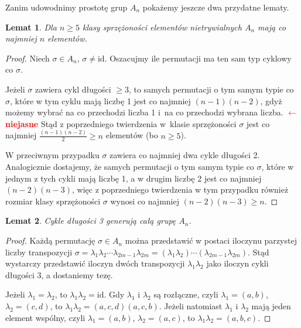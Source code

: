 \documentclass[licencjacka]{pracamgr}
\newtheorem{lemma}{Lemat}[section]
\begin{document}
Zanim udowodnimy prostotę grup $A_n$ pokażemy jeszcze dwa przydatne
lematy.

\begin{lemma}\label{lemma_big_con}
    Dla $n \ge 5$ klasy sprzężoności elementów nietrywialnych $A_n$ mają co najmniej $n$ elementów.
\end{lemma}
\begin{proof}
    Niech $\sigma \in A_n$, $\sigma \ne \mathrm{id}$.
    Oszacujmy ile permutacji ma ten sam typ cyklowy co $\sigma$.

    Jeżeli $\sigma$ zawiera cykl długości $\ge 3$, to samych permutacji o tym samym typie co $\sigma$, które w tym cyklu mają liczbę 1 jest co najmniej $(n-1)(n-2)$,
    gdyż możemy wybrać na co przechodzi liczba 1 i~na co przechodzi wybrana liczba.
    \textcolor{red}{$\leftarrow$ \bf niejasne}
    Stąd z poprzedniego twierdzenia w~klasie sprzężoności $\sigma$ jest co najmniej $\frac{(n-1)(n-2)}{2} \ge n$ elementów (bo $n \ge 5$).

    W przeciwnym przypadku $\sigma$ zawiera co najmniej dwa cykle długości 2.
    Analogicznie dostajemy, że samych permutacji o tym samym typie co $\sigma$,
    które w jednym z tych cykli mają liczbę 1, a w drugim liczbę 2 jest co najmniej $(n-2)(n-3)$,
    więc z poprzedniego twierdzenia w tym przypadku również rozmiar klasy sprzężoności $\sigma$ wynosi co najmniej $(n-2)(n-3) \ge n$.
\end{proof}



\begin{lemma}\label{lemma_3cycles}
    Cykle długości 3 generują całą grupę $A_n$.
\end{lemma}
\begin{proof}
    Każdą permutację  $\sigma \in A_n$ można przedstawić w postaci iloczynu parzystej liczby transpozycji
    $\sigma = \lambda_1 \lambda_2 \cdots \lambda_{2m-1} \lambda_{2m} = (\lambda_1 \lambda_2) \cdots (\lambda_{2m-1} \lambda_{2m})$.
    Stąd wystarczy przedstawić iloczyn dwóch transpozycji $\lambda_1 \lambda_2$ jako iloczyn cykli długości 3, a dostaniemy tezę.

    Jeżeli $\lambda_1 = \lambda_2$, to $\lambda_1 \lambda_2 = \mathrm{id}$.
    Gdy $\lambda_1$ i $\lambda_2$ są rozłączne, czyli $\lambda_1 = (a, b)$, $\lambda_2 = (c, d)$, to $\lambda_1 \lambda_2 = (a, c, d)(a, c, b)$.
    Jeżeli natomiast $\lambda_1$ i $\lambda_2$ mają jeden element wspólny,
    czyli $\lambda_1 = (a, b)$, $\lambda_2 = (a, c)$, to $\lambda_1 \lambda_2 = (a, b, c)$.
\end{proof}
\end{document}
